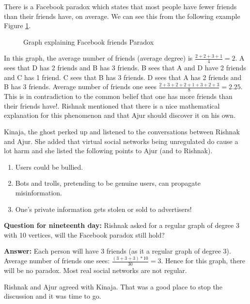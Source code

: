  There is a Facebook paradox which states that most people have fewer friends than their friends have, on average. We can see this from the following example Figure \ref{21g1}.
 \begin{figure}
\begin{center}
\caption{ Graph explaining Facebook friends Paradox}\label{21g1}
\end{center}
\end{figure}

In this graph, the average number of friends (average degree) is $\frac{2+2+3+1}{4}=2$.  A sees that D has 2 friends and B has 3 friends. B sees that A and D have 2 friends and C has 1 friend. C sees that B has 3 friends. D sees that A has 2 friends and B has 3 friends. Average number of friends one sees 
$\frac{2+3+2+2+1+3+2+3}{8}=2.25$. This is in contradiction to the common belief that one has more friends than their friends have!. Rishnak mentioned that there is a nice mathematical explanation for this phenomenon and that Ajur should discover it on his own.

Kinaja, the ghost perked up and listened to the conversations between Rishnak and Ajur. She added that virtual social networks being unregulated do cause a lot harm and she listed the following points to Ajur (and to Rishnak).
\begin{enumerate}
    \item Users could be bullied.
    \item  Bots and trolls, pretending to be genuine users,  can propagate misinformation.
    \item  One's private information gets stolen or sold to advertisers!
\end{enumerate}


\textbf{Question for nineteenth day:} Rishnak asked for a regular graph of degree 3 with 10 vertices, will the Facebook paradox still hold?

\textbf{Answer:} Each person will have 3 friends (as it a regular graph of degree 3).  Average number of friends one sees: $\frac{(3+3+3)*10}{30}=3$. Hence for this graph, there will be no paradox. Most real social networks are not regular.

Rishnak and Ajur agreed with Kinaja. That was a good place to stop the discussion and it was time to go.
